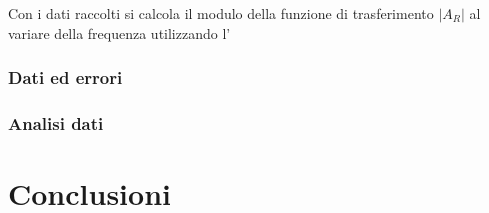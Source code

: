 \documentclass[11pt, a4paper]{article}
\numberwithin{equation}{section} %
\begin{document}
Con i dati raccolti si calcola il modulo della funzione di trasferimento $|A_{R}|$ al variare della frequenza utilizzando l' %

\subsubsection{Dati ed errori}



\subsubsection{Analisi dati}


\section{Conclusioni}

\end{document}
